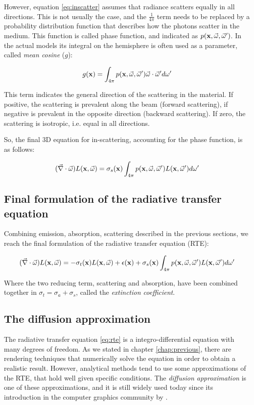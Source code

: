 However, equation \ref{eq:inscatter} assumes that radiance scatters equally in all directions. This is not usually the case, and the $\frac{1}{4 \pi}$ term needs to be replaced by a probability distribution function that describes how the photons scatter in the medium. This function is called phase function, and indicated as $p(\mathbf{x}, \vec{\omega}, \vec{\omega}')$. In the actual models its integral on the hemisphere is often used as a parameter, called \emph{mean cosine} ($g$):

$$
g(\mathbf{x}) = \int_{4 \pi} p(\mathbf{x}, \vec{\omega}, \vec{\omega}') \vec{\omega} \cdot \vec{\omega}' d \omega'
$$

This term indicates the general direction of the scattering in the material. If positive, the scattering is prevalent along the beam (forward scattering), if negative is prevalent in the opposite direction (backward scattering). If zero, the scattering is isotropic, i.e. equal in all directions.

So, the final 3D equation for in-scattering, accounting for the phase function, is as follows:

\begin{equation*}
(\vec{\nabla} \cdot \vec{\omega}) L(\mathbf{x}, \vec{\omega}) = \sigma_s(\mathbf{x}) \int_{4\pi} p(\mathbf{x}, \vec{\omega}, \vec{\omega}') L(\mathbf{x},\vec{\omega}') d\omega'	
\end{equation*}

\subsection{Final formulation of the radiative transfer equation}
Combining emission, absorption, scattering described in the previous sections, we reach the final formulation of the radiative transfer equation (RTE):

\begin{equation}
(\vec{\nabla} \cdot \vec{\omega}) L(\mathbf{x}, \vec{\omega}) =   -\sigma_t(\mathbf{x}) L(\mathbf{x}, \vec{\omega}) + \epsilon(\mathbf{x}) + \sigma_s(\mathbf{x}) \int_{4\pi} p(\mathbf{x}, \vec{\omega}, \vec{\omega}') L(\mathbf{x},\vec{\omega}') d\omega'
\label{eq:rte}
\end{equation}

Where the two reducing term, scattering and absorption, have been combined together in $\sigma_t = \sigma_a + \sigma_s$, called the \emph{extinction coefficient}.


\subsection{The diffusion approximation}
The radiative transfer equation \ref{eq:rte} is a integro-differential equation with many degrees of freedom. As we stated in chapter \ref{chap:previous}, there are rendering techniques that numerically solve the equation in order to obtain a realistic result. However, analytical methods tend to use some approximations of the RTE, that hold well given specific conditions. The \emph{diffusion approximation} \citep{books/daglib/0093591} is one of these approximations, and it is still widely used today since its introduction in the computer graphics community by \citep{raey}. 

